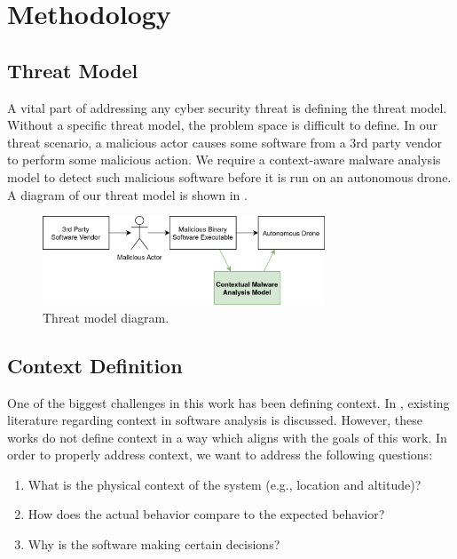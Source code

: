 \documentclass[../stegner_thesis.tex]{subfiles}
\begin{document}
\chapter{Methodology}%
\label{ch:methods}

\section{Threat Model}%
\label{sec:mthd_threat_model}

\par A vital part of addressing any cyber security threat is defining the
threat model.
Without a specific threat model, the problem space is difficult to define.
In our threat scenario, a malicious actor causes some software from a 3rd party
vendor to perform some malicious action.
We require a context-aware malware analysis model to detect such malicious
software before it is run on an autonomous drone.
A diagram of our threat model is shown in .

\begin{figure}[htb]
	\centering
	\includegraphics[width=0.75\textwidth]{img/threat_model.png}
	\caption[Threat model diagram]{Threat model diagram.}%
	\label{fig:threat_model}
\end{figure}

\section{Context Definition}%
\label{sec:mthd_context_def}

\par One of the biggest challenges in this work has been defining context.
In , existing literature regarding context in
software analysis is discussed.
However, these works do not define context in a way which aligns with the goals
of this work.
In order to properly address context, we want to address the following
questions:

\begin{enumerate}
	\item What is the physical context of the system (e.g., location and
		altitude)?
	\item How does the actual behavior compare to the expected behavior?
	\item Why is the software making certain decisions?
\end{enumerate}
\end{document}
